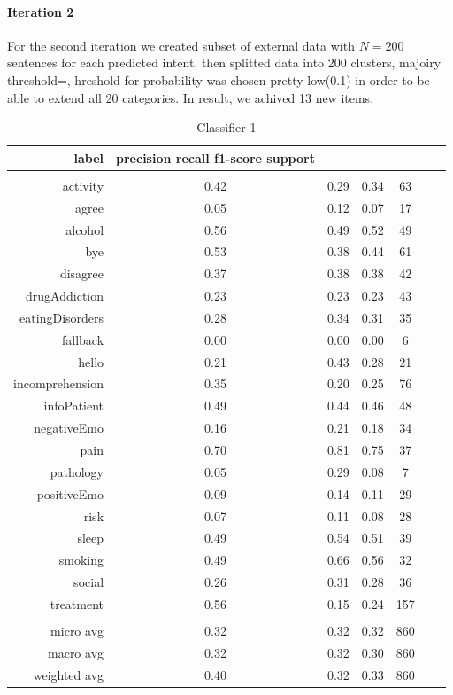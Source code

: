\documentclass[11pt]{article}
\begin{document}
{\paragraph{Iteration 2} For the second iteration we created subset of external data with $N=200$ sentences for each predicted intent, then splitted data into 200 clusters, majoiry threshold=, hreshold for probability was chosen pretty low(0.1) in order to be able to extend all 20 categories. In result, we achived 13 new items.

\begin{table}[htb]
\begin{center}
\begin{tabular}{ |r|c|c|c|c|c|c| }
label  &    precision    recall  f1-score   support\\ \hline 
\\ \hline 
activity &  0.42 & 0.29 & 0.34 &   63\\ \hline 
agree &  0.05 & 0.12 & 0.07 &   17\\ \hline 
alcohol &  0.56 & 0.49 & 0.52 &   49\\ \hline 
bye &  0.53 & 0.38 & 0.44 &   61\\ \hline 
disagree &  0.37 & 0.38 & 0.38 &   42\\ \hline 
drugAddiction &  0.23 & 0.23 & 0.23 &   43\\ \hline 
eatingDisorders &  0.28 & 0.34 & 0.31 &   35\\ \hline 
fallback &  0.00 & 0.00 & 0.00 &    6\\ \hline 
hello &  0.21 & 0.43 & 0.28 &   21\\ \hline 
incomprehension &  0.35 & 0.20 & 0.25 &   76\\ \hline 
infoPatient &  0.49 & 0.44 & 0.46 &   48\\ \hline 
negativeEmo &  0.16 & 0.21 & 0.18 &   34\\ \hline 
pain &  0.70 & 0.81 & 0.75 &   37\\ \hline 
pathology &  0.05 & 0.29 & 0.08 &    7\\ \hline 
positiveEmo &  0.09 & 0.14 & 0.11 &   29\\ \hline 
risk &  0.07 & 0.11 & 0.08 &   28\\ \hline 
sleep &  0.49 & 0.54 & 0.51 &   39\\ \hline 
smoking &  0.49 & 0.66 & 0.56 &   32\\ \hline 
social &  0.26 & 0.31 & 0.28 &   36\\ \hline 
treatment &  0.56 & 0.15 & 0.24 &  157\\ \hline 
\\ \hline 
micro avg &  0.32 & 0.32 & 0.32 &  860\\ \hline 
macro avg &  0.32 & 0.32 & 0.30 &  860\\ \hline 
weighted avg &  0.40 & 0.32 & 0.33 &  860\\ \hline 
\end{tabular}
\caption{Classifier 1}
\end{center}
\end{table}
\FloatBarrier


}
\end{document}
